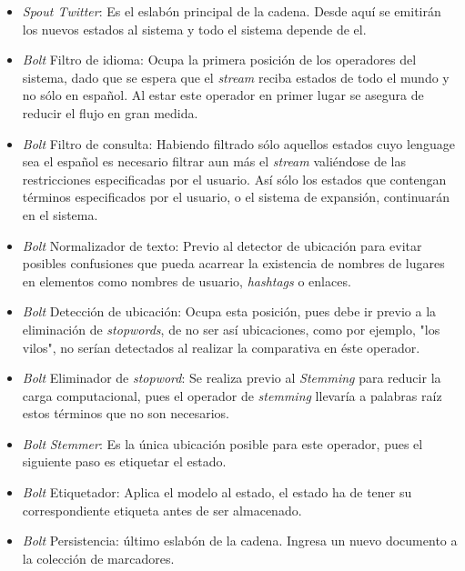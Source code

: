\begin{itemize}
\item \textit{Spout Twitter}: Es el eslabón principal de la cadena. Desde aquí se emitirán los nuevos estados al sistema y todo el sistema depende de el. 
\item \textit{Bolt} Filtro de idioma: Ocupa la primera posición de los operadores del sistema, dado que se espera que el \textit{stream} reciba estados de todo el mundo y no sólo en español. Al estar este operador en primer lugar se asegura de reducir el flujo en gran medida.
\item \textit{Bolt} Filtro de consulta: Habiendo filtrado sólo aquellos estados cuyo lenguage sea el español es necesario filtrar aun más el \textit{stream} valiéndose de las restricciones especificadas por el usuario. Así sólo los estados que contengan términos especificados por el usuario, o el sistema de expansión, continuarán en el sistema.
\item\textit{Bolt} Normalizador de texto: Previo al detector de ubicación para evitar posibles confusiones que pueda acarrear la existencia de nombres de lugares en elementos como nombres de usuario, \textit{hashtags} o enlaces.
\item\textit{Bolt} Detección de ubicación: Ocupa esta posición, pues debe ir previo a la eliminación de \textit{stopwords}, de no ser así ubicaciones, como por ejemplo, "los vilos", no serían detectados al realizar la comparativa en éste operador.
\item\textit{Bolt} Eliminador de \textit{stopword}: Se realiza previo al \textit{Stemming} para reducir la carga computacional, pues el operador de \textit{stemming} llevaría a palabras raíz estos términos que no son necesarios.
\item\textit{Bolt} \textit{Stemmer}: Es la única ubicación posible para este operador, pues el siguiente paso es etiquetar el estado.
\item\textit{Bolt} Etiquetador: Aplica el modelo al estado, el estado ha de tener su correspondiente etiqueta antes de ser almacenado.
\item\textit{Bolt} Persistencia: último eslabón de la cadena. Ingresa un nuevo documento a la colección de marcadores.
\end{itemize}

